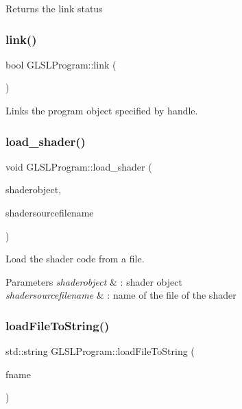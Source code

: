 Returns the link status \hypertarget{class_g_l_s_l_program_a79c92c1c9a1a09c0a091cd52a8f602c6}{}\label{class_g_l_s_l_program_a79c92c1c9a1a09c0a091cd52a8f602c6} 
\subsubsection{\texorpdfstring{link()}{link()}}
{\footnotesize\ttfamily bool G\+L\+S\+L\+Program\+::link (\begin{DoxyParamCaption}{ }\end{DoxyParamCaption})}

Links the program object specified by handle. \hypertarget{class_g_l_s_l_program_afe85e8fe71e8b906f72ca3858531fa39}{}\label{class_g_l_s_l_program_afe85e8fe71e8b906f72ca3858531fa39} 
\subsubsection{\texorpdfstring{load\+\_\+shader()}{load\_shader()}}
{\footnotesize\ttfamily void G\+L\+S\+L\+Program\+::load\+\_\+shader (\begin{DoxyParamCaption}\item[{G\+Luint}]{shaderobject,  }\item[{const char $\ast$}]{shadersourcefilename }\end{DoxyParamCaption})}



Load the shader code from a file. 


\begin{DoxyParams}{Parameters}
{\em shaderobject} & \+: shader object \\
\hline
{\em shadersourcefilename} & \+: name of the file of the shader \\
\hline
\end{DoxyParams}
\hypertarget{class_g_l_s_l_program_afc8f73c15d9696c49783b86a187123be}{}\label{class_g_l_s_l_program_afc8f73c15d9696c49783b86a187123be} 
\subsubsection{\texorpdfstring{load\+File\+To\+String()}{loadFileToString()}}
{\footnotesize\ttfamily std\+::string G\+L\+S\+L\+Program\+::load\+File\+To\+String (\begin{DoxyParamCaption}\item[{const char $\ast$}]{fname }\end{DoxyParamCaption})}



